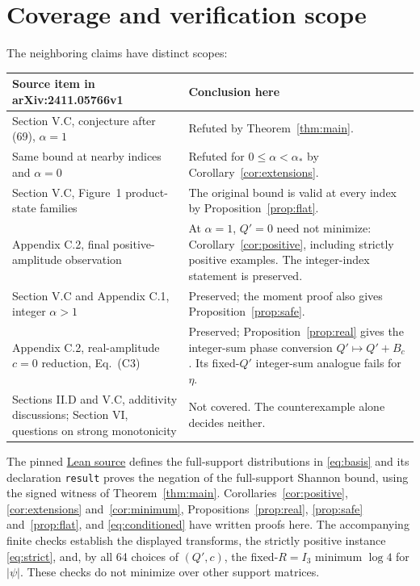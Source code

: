 \documentclass[11pt]{article}
\begin{document}
\section{Coverage and verification scope}
The neighboring claims have distinct scopes:
\begin{center}\small
\begin{tabular}{@{}p{.42\linewidth}p{.52\linewidth}@{}}
\toprule
Source item in arXiv:2411.05766v1 & Conclusion here\\
\midrule
Section V.C, conjecture after (69), $\alpha=1$ & Refuted by Theorem~\ref{thm:main}.\\
Same bound at nearby indices and $\alpha=0$ & Refuted for $0\le\alpha<\alpha_*$ by Corollary~\ref{cor:extensions}.\\
Section V.C, Figure~1 product-state families & The original bound is valid at every index by Proposition~\ref{prop:flat}.\\
Appendix C.2, final positive-amplitude observation & At $\alpha=1$, $Q'=0$ need not minimize: Corollary~\ref{cor:positive}, including strictly positive examples. The integer-index statement is preserved.\\
Section V.C and Appendix C.1, integer $\alpha>1$ & Preserved; the moment proof also gives Proposition~\ref{prop:safe}.\\
Appendix C.2, real-amplitude $c=0$ reduction, Eq.~(C3) & Preserved; Proposition~\ref{prop:real} gives the integer-sum phase conversion $Q'\mapsto Q'+B_c$. Its fixed-$Q'$ integer-sum analogue fails for $\eta$.\\
Sections II.D and V.C, additivity discussions; Section VI, questions on strong monotonicity & Not covered. The counterexample alone decides neither.\\
\bottomrule
\end{tabular}
\end{center}
The pinned \href{https://github.com/the-omega-institute/trureturing/blob/122c987d276498783de7d873378a28b27ced8761/D5/S3/Quantum/Magic/StabilizerAsymmetryShannonBoundRefutation.lean}{Lean source}
defines the full-support distributions in \eqref{eq:basis} and its declaration
\texttt{result} proves the negation of the full-support Shannon bound,
using the signed witness of Theorem~\ref{thm:main}.
Corollaries~\ref{cor:positive}, \ref{cor:extensions} and~\ref{cor:minimum},
Propositions~\ref{prop:real}, \ref{prop:safe} and~\ref{prop:flat}, and
\eqref{eq:conditioned} have written proofs here.
The accompanying finite checks establish the displayed transforms,
the strictly positive instance \eqref{eq:strict}, and, by all 64 choices
of $(Q',c)$, the fixed-$R=I_3$ minimum $\log4$ for $|\psi|$.
These checks do not minimize over other support matrices.
\end{document}
